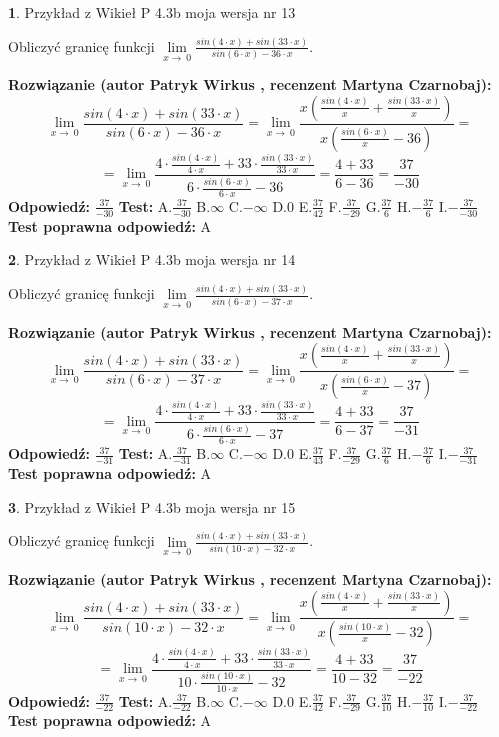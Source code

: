 \documentclass[12pt, a4paper]{article}
\theoremstyle{definition} %
\newtheorem{zad}{}
\newcommand{\zadStart}[1]{\begin{zad}#1\newline}
\newcommand{\zadStop}{\end{zad}}
\newcommand{\rozwStart}[2]{\noindent \textbf{Rozwiązanie (autor #1 , recenzent #2): }\newline}
\newcommand{\rozwStop}{\newline}
\newcommand{\odpStart}{\noindent \textbf{Odpowiedź:}\newline}
\newcommand{\odpStop}{\newline}
\newcommand{\testStart}{\noindent \textbf{Test:}\newline}
\newcommand{\testStop}{\newline}
\newcommand{\kluczStart}{\noindent \textbf{Test poprawna odpowiedź:}\newline}
\newcommand{\kluczStop}{\newline}
\begin{document}
\zadStart{Przykład z Wikieł P 4.3b moja wersja nr 13}


Obliczyć granicę funkcji $\lim\limits_{x\to\ 0}\frac{sin(4 \cdot x)+sin(33 \cdot x)}{sin(6 \cdot x)-36 \cdot x}$.
\zadStop
\rozwStart{Patryk Wirkus}{Martyna Czarnobaj}
$$\lim\limits_{x\to\ 0}\frac{sin(4 \cdot x)+sin(33 \cdot x)}{sin(6 \cdot x)-36 \cdot x}=\lim\limits_{x\to\ 0}\frac{x(\frac{sin(4 \cdot x)}{x}+\frac{sin(33 \cdot x)}{x})}{x(\frac{sin(6 \cdot x)}{x}-36)}=$$
$$=\lim\limits_{x\to\ 0}\frac{4 \cdot \frac{sin(4 \cdot x)}{4 \cdot x}+33 \cdot \frac{sin(33 \cdot x)}{33 \cdot x}}{6 \cdot \frac{sin(6 \cdot x)}{6 \cdot x}-36}=\frac{4+33}{6-36} = \frac{37}{-30}$$
\rozwStop
\odpStart
$\frac{37}{-30}$
\odpStop
\testStart
A.$\frac{37}{-30}$
B.$\infty$
C.$-\infty$
D.$0$
E.$\frac{37}{42}$
F.$\frac{37}{-29}$
G.$\frac{37}{6}$
H.$-\frac{37}{6}$
I.$-\frac{37}{-30}$
\testStop
\kluczStart
A
\kluczStop



\zadStart{Przykład z Wikieł P 4.3b moja wersja nr 14}


Obliczyć granicę funkcji $\lim\limits_{x\to\ 0}\frac{sin(4 \cdot x)+sin(33 \cdot x)}{sin(6 \cdot x)-37 \cdot x}$.
\zadStop
\rozwStart{Patryk Wirkus}{Martyna Czarnobaj}
$$\lim\limits_{x\to\ 0}\frac{sin(4 \cdot x)+sin(33 \cdot x)}{sin(6 \cdot x)-37 \cdot x}=\lim\limits_{x\to\ 0}\frac{x(\frac{sin(4 \cdot x)}{x}+\frac{sin(33 \cdot x)}{x})}{x(\frac{sin(6 \cdot x)}{x}-37)}=$$
$$=\lim\limits_{x\to\ 0}\frac{4 \cdot \frac{sin(4 \cdot x)}{4 \cdot x}+33 \cdot \frac{sin(33 \cdot x)}{33 \cdot x}}{6 \cdot \frac{sin(6 \cdot x)}{6 \cdot x}-37}=\frac{4+33}{6-37} = \frac{37}{-31}$$
\rozwStop
\odpStart
$\frac{37}{-31}$
\odpStop
\testStart
A.$\frac{37}{-31}$
B.$\infty$
C.$-\infty$
D.$0$
E.$\frac{37}{43}$
F.$\frac{37}{-29}$
G.$\frac{37}{6}$
H.$-\frac{37}{6}$
I.$-\frac{37}{-31}$
\testStop
\kluczStart
A
\kluczStop



\zadStart{Przykład z Wikieł P 4.3b moja wersja nr 15}


Obliczyć granicę funkcji $\lim\limits_{x\to\ 0}\frac{sin(4 \cdot x)+sin(33 \cdot x)}{sin(10 \cdot x)-32 \cdot x}$.
\zadStop
\rozwStart{Patryk Wirkus}{Martyna Czarnobaj}
$$\lim\limits_{x\to\ 0}\frac{sin(4 \cdot x)+sin(33 \cdot x)}{sin(10 \cdot x)-32 \cdot x}=\lim\limits_{x\to\ 0}\frac{x(\frac{sin(4 \cdot x)}{x}+\frac{sin(33 \cdot x)}{x})}{x(\frac{sin(10 \cdot x)}{x}-32)}=$$
$$=\lim\limits_{x\to\ 0}\frac{4 \cdot \frac{sin(4 \cdot x)}{4 \cdot x}+33 \cdot \frac{sin(33 \cdot x)}{33 \cdot x}}{10 \cdot \frac{sin(10 \cdot x)}{10 \cdot x}-32}=\frac{4+33}{10-32} = \frac{37}{-22}$$
\rozwStop
\odpStart
$\frac{37}{-22}$
\odpStop
\testStart
A.$\frac{37}{-22}$
B.$\infty$
C.$-\infty$
D.$0$
E.$\frac{37}{42}$
F.$\frac{37}{-29}$
G.$\frac{37}{10}$
H.$-\frac{37}{10}$
I.$-\frac{37}{-22}$
\testStop
\kluczStart
A
\kluczStop
\end{document}
